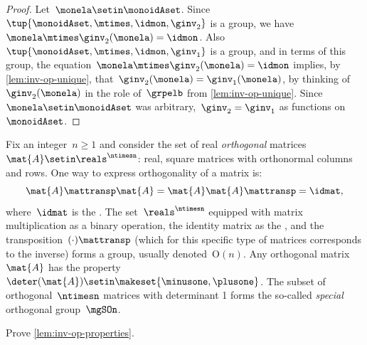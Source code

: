 {\begin{proof}
    Let~$\monela \setin \monoidAset$.
    Since~$\tup{\monoidAset, \mtimes, \idmon, \ginv_2 }$ is a group, we have~$\monela \mtimes \ginv_2(\monela) = \idmon$.
    Also~$\tup{\monoidAset, \mtimes, \idmon, \ginv_1}$ is a group, and in terms of this group, the equation~$\monela \mtimes \ginv_2(\monela) = \idmon$ implies, by \cref{lem:inv-op-unique}, that~$\ginv_2(\monela) = \ginv_1(\monela)$, by thinking of~$\ginv_2(\monela)$ in the role of~$\grpelb$ from \cref{lem:inv-op-unique}.
    Since~$\monela \setin \monoidAset$ was arbitrary,~$\ginv_2 = \ginv_1$ as functions on~$\monoidAset$.
\end{proof}



\begin{example}

    Fix an integer~$n\geq 1$ and consider the set of real \emph{orthogonal} matrices~$\mat{A}\setin \reals^{\ntimesn}$:
    real, square matrices with orthonormal columns and rows.
    One way to express orthogonality of a matrix is:
    \begin{equation}
        \mat{A}\mattransp \mat{A}=\mat{A}\mat{A}\mattransp = \idmat,
    \end{equation}
    where~$\idmat$ is the .
    The set~$\reals^{\ntimesn}$ equipped with matrix multiplication as a binary operation, the identity matrix as the , and the transposition~$(\cdot)\mattransp$ (which for this specific type of matrices corresponds to the inverse) forms a group, usually denoted~$\text{O}(n)$.
    Any orthogonal matrix~$\mat{A}$ has the property~$\deter(\mat{A})\setin \makeset{{{\minusone}},{{\plusone}}}$.
    The subset of orthogonal~$\ntimesn$ matrices with determinant 1 forms the so-called \emph{special} orthogonal group~$\mgSOn$.
\end{example}



\begin{gradedexercise}
    \label{ex:GroupInverseProperties}
    Prove \cref{lem:inv-op-properties}.
\end{gradedexercise}



}
